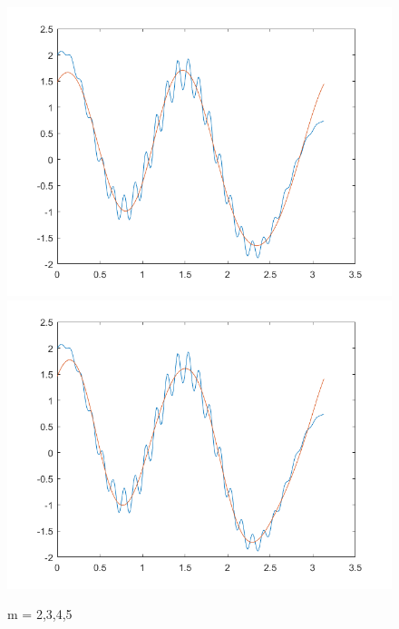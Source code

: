 \documentclass{article}
\begin{document}
\begin{figure}
	\includegraphics[scale=.5]{../res4.png}
	\includegraphics[scale=.5]{../res5.png}
	\caption{m = 2,3,4,5}
\end{figure}
\end{document}
